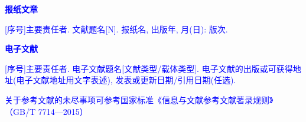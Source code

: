 \printbibliography [keyword={standard},heading=none] 

\textcolor{blue}{\textbf{报纸文章}}

\noindent\textcolor{blue}{[序号]主要责任者. 文献题名[N]. 报纸名, 出版年, 月(日): 版次. }
\cite{xiexide}

\printbibliography [keyword={newspaper},heading=none] 

\textcolor{blue}{\textbf{电子文献}}

\noindent\textcolor{blue}{[序号]主要责任者. 电子文献题名[文献类型/载体类型]. 电子文献的出版或可获得地址(电子文献地址用文字表述), 发表或更新日期/引用日期(任选). }
\cite{yaoboyuan}

\printbibliography [keyword={online},heading=none] 

\textcolor{blue}{关于参考文献的未尽事项可参考国家标准《信息与文献参考文献著录规则》（GB/T 7714—2015）}

